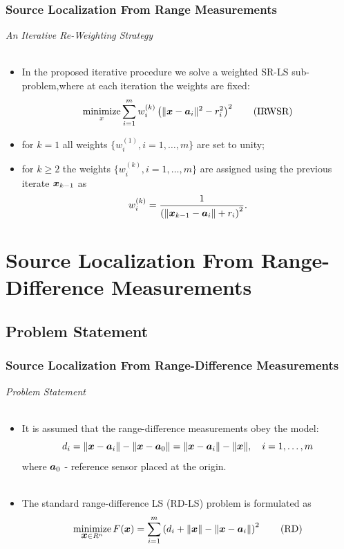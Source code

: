 \documentclass [t] {beamer} %
\begin{document}
\begin{frame}%
\frametitle{Source Localization From Range Measurements}
{\large \textit{An Iterative Re-Weighting Strategy}} 
\\~\\
\normalsize

\begin{itemize}
\item 
 In the proposed iterative procedure we solve a weighted SR-LS sub-problem,where at each iteration the weights are fixed:
\begin{equation} \label{IRWSR}
\mathop{\mbox{minimize}}_{x} \sum_{i=1}^m w_i^{(k)}\left(\|\mbox{\boldmath$x$}-\mbox{\boldmath$a$}_i\|^2-r_i^2\right)^2 \tag{IRWSR}
\end{equation}
\item 
 for $k=1$ all weights $\{w_i^{(1)}, i=1,\ldots, m\}$ are set to unity; \\
 \item 
 for $k\geq2$ the weights $\{w_i^{(k)},i=1,\ldots,m\}$ are assigned using the previous iterate $\mbox{\boldmath$x$}_{k-1}$ as
\begin{equation} 
\nonumber
w_i^{(k)}=\frac{1}{\left(\|\mbox{\boldmath$x$}_{k-1}-\mbox{\boldmath$a$}_i\|+r_i\right)^2}.
\end{equation}

\end{itemize}
\end{frame}



\section[SRD-LS Methods]{Source Localization From Range-Difference Measurements}
\subsection{Problem Statement} %


\begin{frame} %
\frametitle{Source Localization From Range-Difference Measurements} %
{\large \textit{Problem Statement}}
\\~\\
\normalsize
\begin{itemize}
\item 
It is assumed that the range-difference measurements obey the model:
 \begin{equation} 
 \nonumber
 d_i=\|\mbox{\boldmath$x$}-\mbox{\boldmath$a$}_i\|-\|\mbox{\boldmath$x$}-\mbox{\boldmath$a$}_0\|=\|\mbox{\boldmath$x$}-\mbox{\boldmath$a$}_i\|-\|\mbox{\boldmath$x$}\|, \quad i = 1,\ldots,m
 \end{equation}
where $\mbox{\boldmath$a$}_0$ - reference sensor placed at the origin.\\~\\
 \item 
 The standard range-difference LS (RD-LS) problem is formulated as
 \begin{equation} \label{RD}
\mathop{\mbox{minimize}}_{\mbox{\boldmath$x$} \in R^n} F(\mbox{\boldmath$x$})=\sum_{i=1}^m \left(d_i+\|\mbox{\boldmath$x$}\|-\|\mbox{\boldmath$x$}-\mbox{\boldmath$a$}_i\|\right)^2 \tag{RD}
 \end{equation}
 \end{itemize}
\end{frame}
\end{document}
